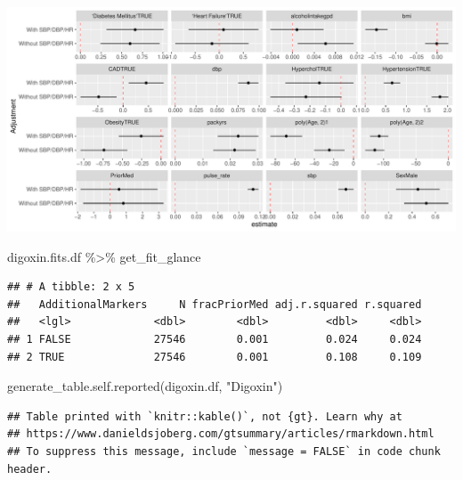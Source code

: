 \documentclass[
]{article}
\newenvironment{Shaded}{\begin{snugshade}}{\end{snugshade}}
\newcommand{\FunctionTok}[1]{\textcolor[rgb]{0.00,0.00,0.00}{#1}}
\newcommand{\NormalTok}[1]{#1}
\newcommand{\SpecialCharTok}[1]{\textcolor[rgb]{0.00,0.00,0.00}{#1}}
\newcommand{\StringTok}[1]{\textcolor[rgb]{0.31,0.60,0.02}{#1}}
\begin{document}
\includegraphics{../results/report_files/figure-latex/digoxin-fit-forest-1.pdf}

\begin{Shaded}
\begin{Highlighting}[]
\NormalTok{digoxin.fits.df }\SpecialCharTok{\%\textgreater{}\%} 
\NormalTok{  get\_fit\_glance}
\end{Highlighting}
\end{Shaded}

\begin{verbatim}
## # A tibble: 2 x 5
##   AdditionalMarkers     N fracPriorMed adj.r.squared r.squared
##   <lgl>             <dbl>        <dbl>         <dbl>     <dbl>
## 1 FALSE             27546        0.001         0.024     0.024
## 2 TRUE              27546        0.001         0.108     0.109
\end{verbatim}

\begin{Shaded}
\begin{Highlighting}[]
\FunctionTok{generate\_table.self.reported}\NormalTok{(digoxin.df, }\StringTok{"Digoxin"}\NormalTok{)}
\end{Highlighting}
\end{Shaded}

\begin{verbatim}
## Table printed with `knitr::kable()`, not {gt}. Learn why at
## https://www.danieldsjoberg.com/gtsummary/articles/rmarkdown.html
## To suppress this message, include `message = FALSE` in code chunk header.
\end{verbatim}
\end{document}
